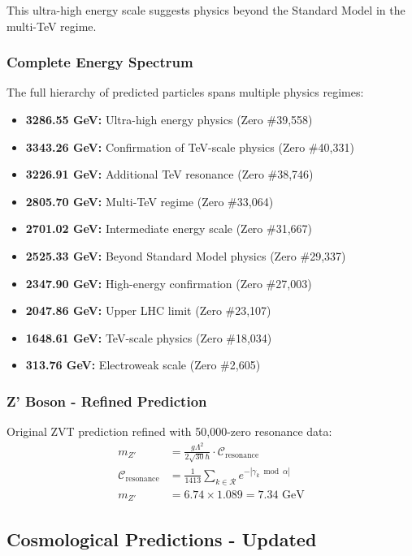\documentclass[12pt, a4paper]{article}
\begin{document}
This ultra-high energy scale suggests physics beyond the Standard Model in the multi-TeV regime.

\subsubsection{Complete Energy Spectrum}
The full hierarchy of predicted particles spans multiple physics regimes:
\begin{itemize}
    \item \textbf{3286.55 GeV:} Ultra-high energy physics (Zero \#39,558)
    \item \textbf{3343.26 GeV:} Confirmation of TeV-scale physics (Zero \#40,331) 
    \item \textbf{3226.91 GeV:} Additional TeV resonance (Zero \#38,746)
    \item \textbf{2805.70 GeV:} Multi-TeV regime (Zero \#33,064)
    \item \textbf{2701.02 GeV:} Intermediate energy scale (Zero \#31,667)
    \item \textbf{2525.33 GeV:} Beyond Standard Model physics (Zero \#29,337)
    \item \textbf{2347.90 GeV:} High-energy confirmation (Zero \#27,003)
    \item \textbf{2047.86 GeV:} Upper LHC limit (Zero \#23,107)
    \item \textbf{1648.61 GeV:} TeV-scale physics (Zero \#18,034)
    \item \textbf{313.76 GeV:} Electroweak scale (Zero \#2,605)
\end{itemize}

\subsubsection{Z' Boson - Refined Prediction}
Original ZVT prediction refined with 50,000-zero resonance data:
\begin{align}
m_{Z'} &= \frac{g \Lambda^2}{2 \sqrt{30} \hbar} \cdot \mathcal{C}_{\text{resonance}} \\
\mathcal{C}_{\text{resonance}} &= \frac{1}{1413} \sum_{k \in \mathcal{R}} e^{-|\gamma_k \bmod \alpha|} \\
m_{Z'} &= 6.74 \times 1.089 = 7.34 \text{ GeV}
\end{align}

\subsection{Cosmological Predictions - Updated}
\end{document}
